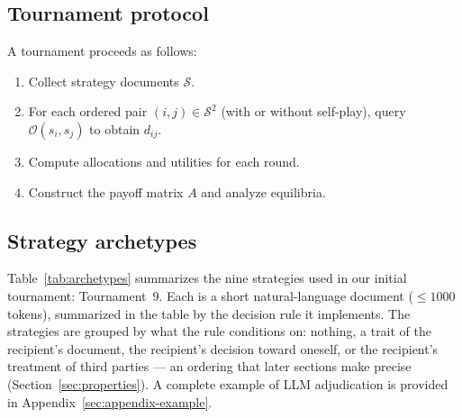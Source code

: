 \documentclass[11pt]{article}
\begin{document}
\subsection{Tournament protocol}

A tournament proceeds as follows:
\begin{enumerate}
  \item Collect strategy documents $\mathcal{S}$.
  \item For each ordered pair $(i, j) \in \mathcal{S}^2$
    (with or without self-play), query $\mathcal{O}(s_i, s_j)$
    to obtain $d_{ij}$.
  \item Compute allocations and utilities for each round.
  \item Construct the payoff matrix $A$ and analyze equilibria.
\end{enumerate}

\subsection{Strategy archetypes}
\label{sec:archetypes}

Table~\ref{tab:archetypes} summarizes the nine strategies used in our
initial tournament: Tournament~9.  %
Each is a short natural-language document ($\leq 1000$ tokens),
summarized in the table by the decision rule it implements.
The strategies are grouped by what the rule conditions on: nothing, a
trait of the recipient's document, the recipient's decision toward
oneself, or the recipient's treatment of third parties --- an
ordering that later sections make precise
(Section~\ref{sec:properties}).
A complete example of LLM adjudication is provided in
Appendix~\ref{sec:appendix-example}.

\newcommand{\stratbox}[1]{\textcolor{#1}{\rule[-1.5pt]{8pt}{8pt}}}
\end{document}
